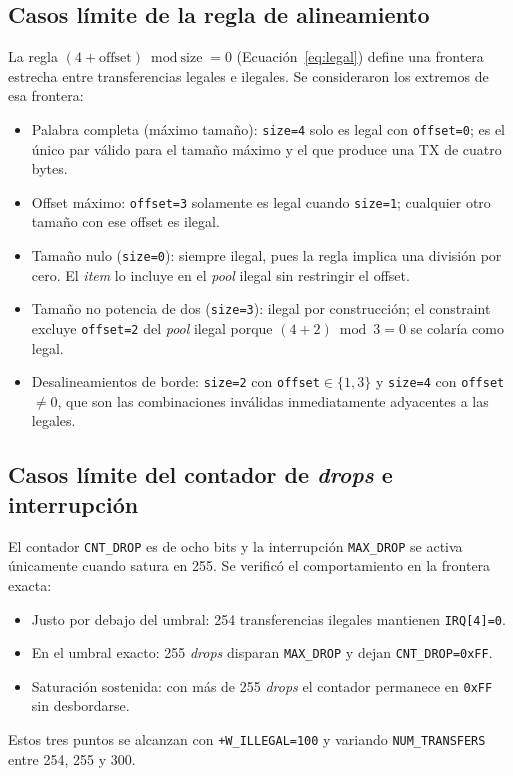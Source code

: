 \documentclass[conference]{IEEEtran}
\begin{document}
\subsection{Casos límite de la regla de alineamiento}
La regla $(4+\text{offset})\bmod\text{size}=0$
(Ecuación~\eqref{eq:legal}) define una frontera estrecha entre transferencias
legales e ilegales. Se consideraron los extremos de esa frontera:
\begin{itemize}
  \item Palabra completa (máximo tamaño): \texttt{size=4} solo es legal
  con \texttt{offset=0}; es el único par válido para el tamaño máximo y el que
  produce una TX de cuatro bytes.
  \item Offset máximo: \texttt{offset=3} solamente es legal cuando
  \texttt{size=1}; cualquier otro tamaño con ese offset es ilegal.
  \item Tamaño nulo (\texttt{size=0}): siempre ilegal, pues la regla
  implica una división por cero. El \textit{item} lo incluye en el \textit{pool}
  ilegal sin restringir el offset.
  \item Tamaño no potencia de dos (\texttt{size=3}): ilegal por
  construcción; el constraint excluye \texttt{offset=2} del \textit{pool} ilegal
  porque $(4+2)\bmod 3=0$ se colaría como legal.
  \item Desalineamientos de borde: \texttt{size=2} con
  \texttt{offset}$\in\{1,3\}$ y \texttt{size=4} con \texttt{offset}$\neq 0$, que
  son las combinaciones inválidas inmediatamente adyacentes a las legales.
\end{itemize}

\subsection{Casos límite del contador de \textit{drops} e interrupción}
El contador \texttt{CNT\_DROP} es de ocho bits y la interrupción
\texttt{MAX\_DROP} se activa únicamente cuando satura en 255. Se verificó el
comportamiento en la frontera exacta:
\begin{itemize}
  \item Justo por debajo del umbral: 254 transferencias ilegales
  mantienen \texttt{IRQ[4]=0}.
  \item En el umbral exacto: 255 \textit{drops} disparan
  \texttt{MAX\_DROP} y dejan \texttt{CNT\_DROP=0xFF}.
  \item Saturación sostenida: con más de 255 \textit{drops} el contador
  permanece en \texttt{0xFF} sin desbordarse.
\end{itemize}
Estos tres puntos se alcanzan con \texttt{+W\_ILLEGAL=100} y variando
\texttt{NUM\_TRANSFERS} entre 254, 255 y 300.
\end{document}

